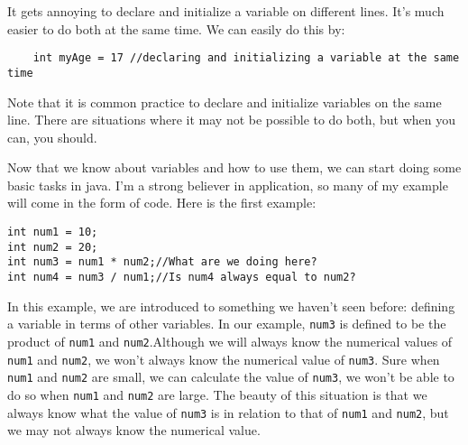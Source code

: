 \documentclass[11pt,fleqn]{article}
\begin{document}
It gets annoying to declare and initialize a variable on different lines. It's
much easier to do both at the same time. We can easily do this by:

\begin{verbatim}
    int myAge = 17 //declaring and initializing a variable at the same time
\end{verbatim}

Note that it is common practice to declare and initialize variables on the same
line. There are situations where it may not be possible to do both, but when you
can, you should.

Now that we know about variables and how to use them, we can start doing some
basic tasks in java. I'm a strong believer in application, so many of my example
will come in the form of code. Here is the first example:

\begin{verbatim}
int num1 = 10;
int num2 = 20;
int num3 = num1 * num2;//What are we doing here?
int num4 = num3 / num1;//Is num4 always equal to num2?
\end{verbatim}

In this example, we are introduced to something we haven't seen before: defining
a variable in terms of other variables. In our example, \texttt{num3} is defined
to be the product of \texttt{num1} and \texttt{num2}.Although we will always
know the numerical values of \texttt{num1} and \texttt{num2}, we won't always
know the numerical value of \texttt{num3}. Sure when \texttt{num1} and
\texttt{num2} are small, we can calculate the value of \texttt{num3}, we won't
be able to do so when \texttt{num1} and \texttt{num2} are large. The beauty of
this situation is that we always know what the value of \texttt{num3} is in
relation to that of \texttt{num1} and \texttt{num2}, but we may not always know
the numerical value. 
\end{document}
